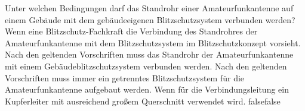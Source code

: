     {Unter welchen Bedingungen darf das Standrohr einer Amateurfunkantenne auf einem Gebäude mit dem gebäudeeigenen Blitzschutzsystem verbunden werden?}
    {Wenn eine Blitzschutz-Fachkraft die Verbindung des Standrohres der Amateurfunkantenne mit dem Blitzschutzsystem im Blitzschutzkonzept vorsieht.}
    {Nach den geltenden Vorschriften muss das Standrohr der Amateurfunkantenne mit einem Gebäudeblitzschutzsystem verbunden werden.}
    {Nach den geltenden Vorschriften muss immer ein getrenntes Blitzschutzsystem für die Amateurfunkantenne aufgebaut werden.}
    {Wenn für die Verbindungsleitung ein Kupferleiter mit ausreichend großem Querschnitt verwendet wird.}
    {false}{false}
